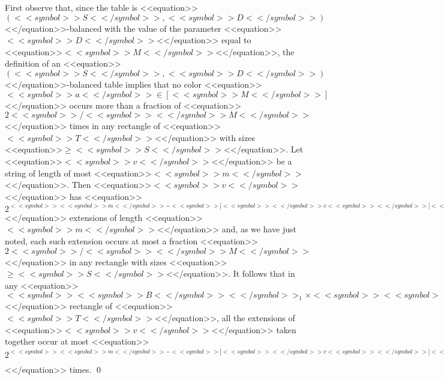 \documentclass[proceedings]{stacs}
\begin{document}
First observe that, since the table is <<equation>>$(<<symbol>>S<</symbol>>,<<symbol>>D<</symbol>>)$<</equation>>-balanced with the value of the parameter <<equation>>$<<symbol>>D<</symbol>>$<</equation>> equal to <<equation>>$<<symbol>>M<</symbol>>$<</equation>>, the definition of an <<equation>>$(<<symbol>>S<</symbol>>,<<symbol>>D<</symbol>>)$<</equation>>-balanced table implies that no color <<equation>>$<<symbol>>a<</symbol>> \in [<<symbol>>M<</symbol>>]$<</equation>> occurs more than a fraction of <<equation>>$2<<symbol>>/<<symbol>><</symbol>>M<</symbol>>$<</equation>> times in any rectangle of <<equation>>$<<symbol>>T<</symbol>>$<</equation>> with sizes <<equation>>$\geq <<symbol>>S<</symbol>>$<</equation>>. Let <<equation>>$<<symbol>>v<</symbol>>$<</equation>> be a string of length of most <<equation>>$<<symbol>>m<</symbol>>$<</equation>>. Then <<equation>>$<<symbol>>v<</symbol>>$<</equation>> has <<equation>>$2^{<<symbol>><<symbol>>m<</symbol>>-<<symbol>>|<<symbol>><</symbol>>v<<symbol>><</symbol>>|<</symbol>><</symbol>>}$<</equation>> extensions of length <<equation>>$<<symbol>>m<</symbol>>$<</equation>> and, as we have just noted, each such extension occurs at most a fraction <<equation>>$2<<symbol>>/<<symbol>><</symbol>>M<</symbol>>$<</equation>> in any rectangle with sizes <<equation>>$\geq <<symbol>>S<</symbol>>$<</equation>>. It follows that in any <<equation>>$<<symbol>><<symbol>>B<</symbol>><</symbol>>_1 \times <<symbol>><<symbol>>B<</symbol>><</symbol>>_2$<</equation>> rectangle of <<equation>>$<<symbol>>T<</symbol>>$<</equation>>, all the extensions of <<equation>>$<<symbol>>v<</symbol>>$<</equation>> taken together occur at most <<equation>>$2^{<<symbol>><<symbol>>m<</symbol>>-<<symbol>>|<<symbol>><</symbol>>v<<symbol>><</symbol>>|<</symbol>><</symbol>>} \cdot (2<<symbol>>/<<symbol>><</symbol>>M<</symbol>>) \cdot <<symbol>>|<<symbol>><<symbol>><</symbol>>B<</symbol>><</symbol>>_1 \times <<symbol>><<symbol>>B<</symbol>><</symbol>>_2<<symbol>>|<</symbol>> = (2<<symbol>>/<</symbol>>2^{<<symbol>><<symbol>>|<<symbol>><</symbol>>v<<symbol>><</symbol>>|<</symbol>><</symbol>>}) \cdot <<symbol>>|<<symbol>><<symbol>><</symbol>>B<</symbol>><</symbol>>_1 \times <<symbol>><<symbol>>B<</symbol>><</symbol>>_2<<symbol>>|<</symbol>>$<</equation>> times.
\qed
\end{document}

